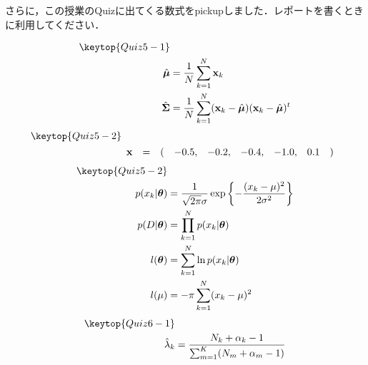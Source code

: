 \documentclass[12pt,a4j,dvipdfmx]{jarticle}
\begin{document}
さらに，この授業のQuizに出てくる数式をpickupしました．レポートを書くときに利用してください．

\begin{align*}
\keytop{Quiz5-1} & \\
\hat{\bm{\mu}}    &= \displaystyle{\frac{1}{N}\sum^N_{k=1}\mathbf{x}_k} \\
\hat{\bm{\Sigma}} &= \displaystyle{\frac{1}{N}\sum^N_{k=1}}(\mathbf{x}_k-\hat{\bm{\mu}})(\mathbf{x}_k-\hat{\bm{\mu}})^t
\end{align*}
\begin{align*}
\keytop{Quiz5-2} & \\
    &
    \begin{array}{cccrrrrrc}
        \mathbf{x} &=& ( & -0.5, & -0.2, & -0.4, & -1.0, & 0.1 & )
    \end{array}
\end{align*}
\begin{align*}
\keytop{Quiz5-2} & \\
    p(x_k|\bm{\theta}) &= \displaystyle{\frac{1}{\sqrt{2\pi}\sigma}} \exp \left\{ - \frac{(x_k-\mu)^2}{2\sigma^2}\right\} \\
    p(D|\bm{\theta})   &= \prod_{k=1}^{N} p(x_k|\bm{\theta}) \\
    l(\bm{\theta})     &= \sum_{k=1}^{N} \ln p(x_k|\bm{\theta}) \\
    l(\mu)             &= -\pi \sum_{k=1}^{N} (x_k - \mu)^2 
\end{align*}
\begin{align*}
\keytop{Quiz6-1} & \\
    \hat{\lambda}_k &= \frac{N_k + \alpha_k -1}{\sum_{m=1}^K (N_m + \alpha_m - 1)}
\end{align*}
\end{document}
